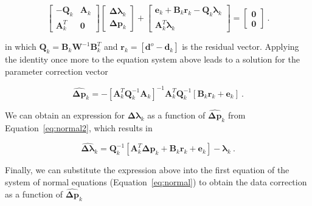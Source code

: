 \begin{equation}
  \begin{bmatrix}
    -\mathbf{Q}_k & \mathbf{A}_k \\
    \mathbf{A}_k^T & \mathbf{0}
  \end{bmatrix}
  \begin{bmatrix}
    \boldsymbol{\Delta\lambda}_k \\
    \mathbf{\Delta p}_k
  \end{bmatrix}
  +
  \begin{bmatrix}
    \mathbf{e}_k + \mathbf{B}_k\mathbf{r}_k
    - \mathbf{Q}_k \boldsymbol{\lambda}_k
    \\
    \mathbf{A}_k^T\boldsymbol{\lambda}_k
  \end{bmatrix}
  =
  \begin{bmatrix}
    \mathbf{0}
    \\
    \mathbf{0}
  \end{bmatrix}
  \label{eq:normal2}
  \ .
\end{equation}

\noindent
in which $\mathbf{Q}_k = \mathbf{B}_k\mathbf{W}^{-1}\mathbf{B}_k^T$ and
$\mathbf{r}_k = \left[\mathbf{d}^o - \mathbf{d}_k\right]$ is the residual
vector.
Applying the identity once more to the equation system above leads to a
solution for the parameter correction vector

\begin{equation}
  \hat{\mathbf{\Delta p}}_k =
  -\left[\mathbf{A}_k^T\mathbf{Q}_k^{-1}\mathbf{A}_k\right]^{-1}
  \mathbf{A}_k^T\mathbf{Q}_k^{-1}
  \left[\mathbf{B}_k\mathbf{r}_k + \mathbf{e}_k\right]
  \ .
  \label{eq:deltap}
\end{equation}

We can obtain an expression for $\boldsymbol{\Delta\lambda}_k$ as a function of
$\hat{\mathbf{\Delta p}}_k$ from Equation~\ref{eq:normal2}, which results in

\begin{equation}
  \hat{\boldsymbol{\Delta\lambda}}_k =
  \mathbf{Q}_k^{-1}
  \left[\mathbf{A}_k^T\mathbf{\Delta p}_k + \mathbf{B}_k\mathbf{r}_k + \mathbf{e}_k\right]
  -\boldsymbol{\lambda}_k
  \ .
  \label{eq:deltalambda}
\end{equation}

\noindent
Finally, we can substitute the expression above into the first equation of the
system of normal equations (Equation~\ref{eq:normal}) to obtain the data
correction as a function of $\hat{\mathbf{\Delta p}}_k$

